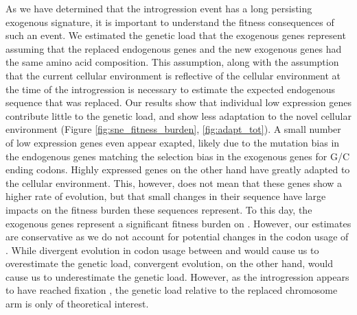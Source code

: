 As we have determined that the introgression event has a long persisting exogenous signature, it is important to understand the fitness consequences of such an event.
We estimated the genetic load that the exogenous genes represent assuming that the replaced endogenous genes and the new exogenous genes had the same amino acid composition.
This assumption, along with the assumption that the current \kluyveri cellular environment is reflective of the cellular environment at the time of the introgression is necessary to estimate the expected endogenous sequence that was replaced.
Our results show that individual low expression genes contribute little to the genetic load, and show less adaptation to the novel cellular environment (Figure \ref{fig:sne_fitness_burden}, \ref{fig:adapt_tot}).
A small number of low expression genes even appear exapted, likely due to the mutation bias in the endogenous genes matching the selection bias in the exogenous genes for G/C ending codons.
Highly expressed genes on the other hand have greatly adapted to the \kluyveri cellular environment.
This, however, does not mean that these genes show a higher rate of evolution, but that small changes in their sequence have large impacts on the fitness burden these sequences represent.
To this day, the exogenous genes represent a significant fitness burden on \kluyveri.
However, our estimates are conservative as we do not account for potential changes in the codon usage of \gossypii. 
While divergent evolution in codon usage between \gossypii and \kluyveri would cause us to overestimate the genetic load, convergent evolution, on the other hand, would cause us to underestimate the genetic load.
However, as the introgression appears to have reached fixation \citep{friedrich2015}, the genetic load relative to the replaced chromosome arm is only of theoretical interest.

